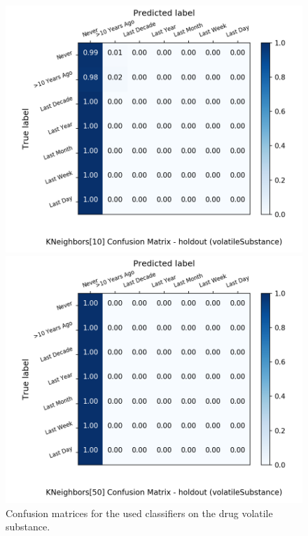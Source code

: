 \begin{figure}[H]
\begin{minipage}[b]{0.32\textwidth}
		\includegraphics[width=1.1\textwidth]{Plots/volatileSubstance_KNeighbors_10_balance_False_holdout.png}
  \end{minipage}
	\begin{minipage}[b]{0.32\textwidth}
		\includegraphics[width=1.1\textwidth]{Plots/volatileSubstance_KNeighbors_50_balance_False_holdout.png}
  \end{minipage}
	\caption{Confusion matrices for the used classifiers on the drug volatile substance.}
\end{figure}
